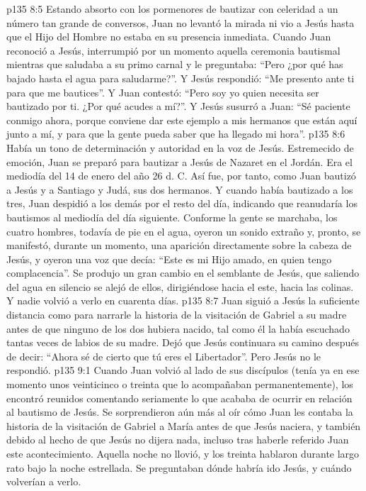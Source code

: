 \vs p135 8:5 Estando absorto con los pormenores de bautizar con celeridad a un número tan grande de conversos, Juan no levantó la mirada ni vio a Jesús hasta que el Hijo del Hombre no estaba en su presencia inmediata. Cuando Juan reconoció a Jesús, interrumpió por un momento aquella ceremonia bautismal mientras que saludaba a su primo carnal y le preguntaba: “Pero ¿por qué has bajado hasta el agua para saludarme?”. Y Jesús respondió: “Me presento ante ti para que me bautices”. Y Juan contestó: “Pero soy yo quien necesita ser bautizado por ti. ¿Por qué acudes a mí?”. Y Jesús susurró a Juan: “Sé paciente conmigo ahora, porque conviene dar este ejemplo a mis hermanos que están aquí junto a mí, y para que la gente pueda saber que ha llegado mi hora”.
\vs p135 8:6 \pc Había un tono de determinación y autoridad en la voz de Jesús. Estremecido de emoción, Juan se preparó para bautizar a Jesús de Nazaret en el Jordán. Era el mediodía del 14 de enero del año 26 d. C. Así fue, por tanto, como Juan bautizó a Jesús y a Santiago y Judá, sus dos hermanos. Y cuando había bautizado a los tres, Juan despidió a los demás por el resto del día, indicando que reanudaría los bautismos al mediodía del día siguiente. Conforme la gente se marchaba, los cuatro hombres, todavía de pie en el agua, oyeron un sonido extraño y, pronto, se manifestó, durante un momento, una aparición directamente sobre la cabeza de Jesús, y oyeron una voz que decía: “Este es mi Hijo amado, en quien tengo complacencia”. Se produjo un gran cambio en el semblante de Jesús, que saliendo del agua en silencio se alejó de ellos, dirigiéndose hacia el este, hacia las colinas. Y nadie volvió a verlo en cuarenta días.
\vs p135 8:7 Juan siguió a Jesús la suficiente distancia como para narrarle la historia de la visitación de Gabriel a su madre antes de que ninguno de los dos hubiera nacido, tal como él la había escuchado tantas veces de labios de su madre. Dejó que Jesús continuara su camino después de decir: “Ahora sé de cierto que tú eres el Libertador”. Pero Jesús no le respondió.
\vs p135 9:1 Cuando Juan volvió al lado de sus discípulos (tenía ya en ese momento unos veinticinco o treinta que lo acompañaban permanentemente), los encontró reunidos comentando seriamente lo que acababa de ocurrir en relación al bautismo de Jesús. Se sorprendieron aún más al oír cómo Juan les contaba la historia de la visitación de Gabriel a María antes de que Jesús naciera, y también debido al hecho de que Jesús no dijera nada, incluso tras haberle referido Juan este acontecimiento. Aquella noche no llovió, y los treinta hablaron durante largo rato bajo la noche estrellada. Se preguntaban dónde habría ido Jesús, y cuándo volverían a verlo.
